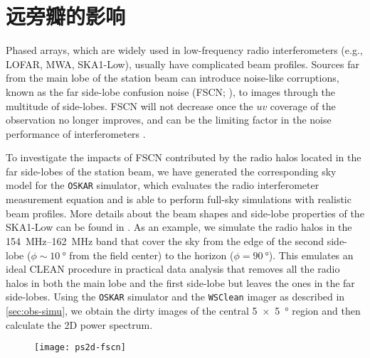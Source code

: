 \section{远旁瓣的影响}
\label{sec:fscn}

Phased arrays, which are widely used in low-frequency radio
interferometers (e.g., LOFAR, MWA, SKA1-Low), usually have complicated
beam profiles.
Sources far from the main lobe of the station beam can introduce
noise-like corruptions, known as the far side-lobe confusion noise
(FSCN; ), to images through the multitude of
side-lobes.
FSCN will not decrease once the $uv$ coverage of the observation no
longer improves, and can be the limiting factor in the noise
performance of interferometers \cite{mort2017}.

To investigate the impacts of FSCN contributed by the radio halos
located in the far side-lobes of the station beam, we have generated
the corresponding sky model for the \texttt{OSKAR} simulator,
which evaluates the radio interferometer measurement equation
\cite{smirnov2011} and is able to perform full-sky simulations with
realistic beam profiles.
More details about the beam shapes and side-lobe properties of the
SKA1-Low can be found in .
As an example, we simulate the radio halos in the \SIrange{154}{162}{\MHz}
band that cover the sky from the edge of the second side-lobe
($\phi \sim \SI{10}{\degree}$ from the field center) to the horizon
($\phi = \SI{90}{\degree}$).
This emulates an ideal CLEAN procedure in practical data analysis that
removes all the radio halos in both the main lobe and the first side-lobe
but leaves the ones in the far side-lobes.
Using the \texttt{OSKAR} simulator and the \texttt{WSClean} imager as
described in \autoref{sec:obs-simu}, we obtain the dirty images of the
central \SI{5 x 5}{\degree} region and then
calculate the 2D power spectrum.

\begin{figure}[htp]
  \centering
  \texttt{[image: ps2d-fscn]}
  \label{fig:ps2d-fscn}
\end{figure}

